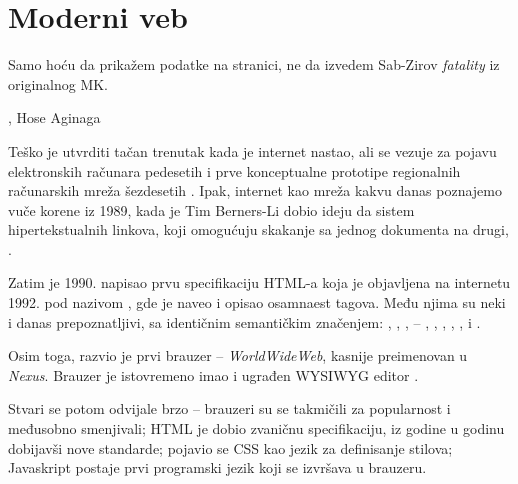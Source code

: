 \chapter{Moderni veb}

\epigraph{
  Samo hoću da prikažem podatke na stranici, ne da izvedem Sab-Zirov \textsl{fatality} iz originalnog MK.
}{, Hose Aginaga \cite{hose:how-js-feels-2016}}

Teško je utvrditi tačan trenutak kada je internet nastao, ali se vezuje za pojavu elektronskih računara pedesetih i prve konceptualne prototipe regionalnih računarskih mreža šezdesetih \cite{history:internet}.
Ipak, internet kao mreža kakvu danas poznajemo vuče korene iz 1989, kada je Tim Berners-Li dobio ideju da sistem hipertekstualnih linkova, koji omogućuju skakanje sa jednog dokumenta na drugi,  \cite{lee:answers-for-young-people}.

Zatim je 1990. napisao prvu specifikaciju HTML-a koja je objavljena na internetu 1992. pod nazivom , gde je naveo i opisao osamnaest tagova. Među njima su neki i danas prepoznatljivi, sa identičnim semantičkim značenjem: , , ,  -- , , , , ,  i  \cite{lee:html-tags}.

Osim toga, razvio je prvi brauzer -- \textit{WorldWideWeb}, kasnije preimenovan u \textit{Nexus}.
Brauzer je istovremeno imao i ugrađen WYSIWYG editor \cite{lee:www-browser}.

Stvari se potom odvijale brzo -- brauzeri su se takmičili za popularnost i međusobno smenjivali; HTML je dobio zvaničnu specifikaciju, iz godine u godinu dobijavši nove standarde; pojavio se CSS kao jezik za definisanje stilova; Javaskript postaje prvi programski jezik koji se izvršava u brauzeru.










